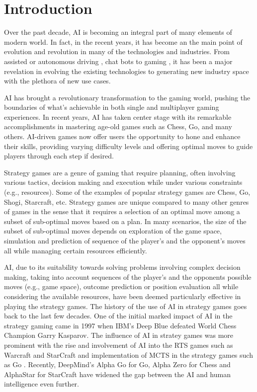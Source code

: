 \chapter*{Introduction}

Over the past decade, \ac{AI} is becoming an integral part of many elements of modern world. In fact, in the recent years, it has become an the main point of evolution and revolution in many of the technologies and industries. From assisted or autonomous driving \citep{Ma2020Artificial}, chat bots \cite{Wu2023ABrief} to gaming \cite{Skinner2010Artificial}, it has been a major revelation in evolving the existing technologies to generating new industry space with the plethora of new use cases.   

\ac{AI} has brought a revolutionary transformation to the gaming world, pushing the boundaries
of what's achievable in both single and multiplayer gaming experiences. In recent years, \ac{AI} has taken center
stage with its remarkable accomplishments in mastering age-old games such as Chess, Go, and many others.
\ac{AI}-driven games now offer users the opportunity to hone and enhance their skills, providing varying difficulty
levels and offering optimal moves to guide players through each step if desired.

Strategy games are a genre of gaming that require planning, often involving various tactics, decision making and execution while under various constraints (e.g., resources). Some of the examples of popular strategy games are Chess, Go, Shogi, Starcraft, etc. Strategy games are unique compared to many other genres of games in the sense that it requires a selection of an optimal move among a subset of sub-optimal moves based on  a plan. In many scenarios, the size of the subset of sub-optimal moves depends on exploration of the game space, simulation and prediction of sequence of the player's and the opponent's moves all while managing certain resources efficiently.

\ac{AI}, due to its suitability towards solving problems involving complex decision making, taking into account sequences of the player's and the opponents possible moves (e.g., game space), outcome prediction or position evaluation all while considering the available resources, have been deemed particularly effective in playing the strategy games. The history of the use of \ac{AI} in strategy games goes back to the last few decades. One of the initial marked impact of \ac{AI} in the strategy gaming came in 1997 when IBM's Deep Blue \cite{Campbell2002Deep} defeated World Chess Champion Garry Kasparov. The influence of \ac{AI} in stratey games was more prominent with the rise and involvement of \ac{AI} into the \ac{RTS} games such as Warcraft and StarCraft \cite{Robertson2014Review} and implementation of \ac{MCTS} in the strategy games such as Go \cite{Huang2011Monte}. Recently, DeepMind's Alpha Go for Go, Alpha Zero for Chess \cite{Silver2017Mastering} and AlphaStar for StarCraft \cite{Team2019Alphastar} have widened the gap between the \ac{AI} and human intelligence even further.


